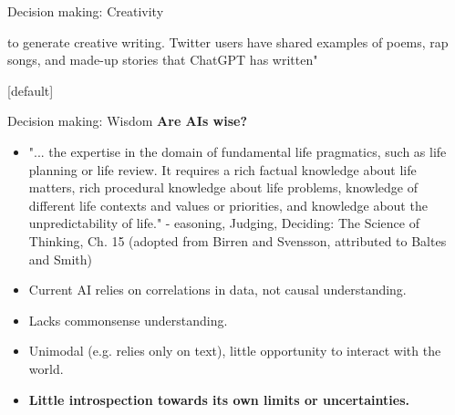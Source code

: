 \documentclass[8pt]{beamer}
\begin{document}
\begin{frame}[t]{Decision making: Creativity}
{\begin{itemize}
				to generate creative writing. Twitter users have shared examples
				of poems, rap songs, and made-up stories that ChatGPT has written"
			\end{itemize}
			\vspace{0.3cm}
			\centering
		}
	\end{frame}

	[default]

	\begin{frame}[t]{Decision making: Wisdom}
		\textbf{Are AIs wise?}
		\begin{itemize}
			\item "... the expertise in the domain of fundamental life pragmatics, such as life planning or life review. It requires a rich factual knowledge about life matters, rich procedural knowledge about life problems, knowledge of different life contexts and values or priorities, and knowledge about the unpredictability of life." - easoning, Judging, Deciding: The Science of Thinking, Ch. 15 (adopted from Birren and Svensson, attributed to Baltes and Smith)
			\item Current AI relies on correlations in data, not causal understanding.
			\item Lacks commonsense understanding.
			\item Unimodal (e.g. relies only on text), little opportunity to interact with the world.
			\item \textbf{Little introspection towards its own limits or uncertainties.}
		\end{itemize}
	\end{frame}
\end{document}
